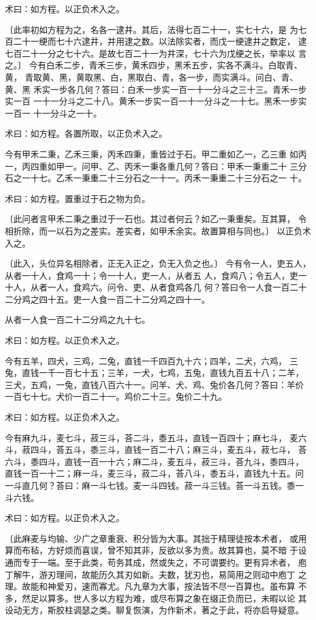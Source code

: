 \documentclass[12pt,UTF8]{ctexbook}
\begin{document}
术曰：如方程。以正负术入之。

〔此率初如方程为之，名各一逮井。其后，法得七百二十一，实七十六，是 为七百二十一绠而七十六逮井，并用逮之数。以法除实者，而戊一绠逮井之数定， 逮七百二十一分之七十六。是故七百二十一为井深，七十六为戊绠之长，举率以 言之。〕 今有白禾二步，青禾三步，黄禾四步，黑禾五步，实各不满斗。白取青、黄， 青取黄、黑，黄取黑、白，黑取白、青，各一步，而实满斗。问白、青、黄、黑 禾实一步各几何？答曰：白禾一步实一百一十一分斗之三十三。青禾一步实一百 一十一分斗之二十八。黄禾一步实一百一十一分斗之一十七。黑禾一步实一百一 十一分斗之一十。

术曰：如方程。各置所取，以正负术入之。

今有甲禾二秉，乙禾三秉，丙禾四秉，重皆过于石。甲二重如乙一，乙三重 如丙一，丙四重如甲一。问甲、乙、丙禾一秉各重几何？答曰：甲禾一秉重二十 三分石之一十七。乙禾一秉重二十三分石之一十一。丙禾一秉重二十三分石之一 十。

术曰：如方程。置重过于石之物为负。

〔此问者言甲禾二秉之重过于一石也。其过者何云？如乙一秉重矣。互其算， 令相折除，而一以石为之差实。差实者，如甲禾余实。故置算相与同也。〕 以正负术入之。

〔此入，头位异名相除者，正无入正之，负无入负之也。〕 今有令一人，吏五人，从者一十人，食鸡一十；令一十人，吏一人，从者五 人，食鸡八；令五人，吏一十人，从者一人，食鸡六。问令、吏、从者食鸡各几 何？答曰令一人食一百二十二分鸡之四十五。吏一人食一百二十二分鸡之四十一。

从者一人食一百二十二分鸡之九十七。

术曰：如方程。以正负术入之。

今有五羊，四犬，三鸡，二兔，直钱一千四百九十六；四羊，二犬，六鸡， 三兔，直钱一千一百七十五；三羊，一犬，七鸡，五兔，直钱九百五十八；二羊， 三犬，五鸡，一兔，直钱八百六十一。问羊、犬、鸡、兔价各几何？答曰：羊价 一百七十七。犬价一百二十一。鸡价二十三。兔价二十九。

术曰：如方程。以正负术入之。

今有麻九斗，麦七斗，菽三斗，荅二斗，黍五斗，直钱一百四十；麻七斗， 麦六斗，菽四斗，荅五斗，黍三斗，直钱一百二十八；麻三斗，麦五斗，菽七斗， 荅六斗，黍四斗，直钱一百一十六；麻二斗，麦五斗，菽三斗，荅九斗，黍四斗， 直钱一百一十二；麻一斗，麦三斗，菽二斗，荅八斗，黍五斗，直钱九十五。问 一斗直几何？荅曰：麻一斗七钱。麦一斗四钱。菽一斗三钱。荅一斗五钱。黍一 斗六钱。

术曰：如方程。以正负术入之。

〔此麻麦与均输、少广之章重衰、积分皆为大事。其拙于精理徒按本术者， 或用算而布毡，方好烦而喜误，曾不知其非，反欲以多为贵。故其算也，莫不暗 于设通而专于一端。至于此类，苟务其成，然或失之，不可谓要约。更有异术者， 庖丁解牛，游刃理间，故能历久其刃如新。夫数，犹刃也，易简用之则动中庖丁 之理。故能和神爱刃，速而寡尤。凡九章为大事，按法皆不尽一百算也。虽布算 不多，然足以算多。世人多以方程为难，或尽布算之象在缀正负而已，未暇以论 其设动无方，斯胶柱调瑟之类。聊复恢演，为作新术，著之于此，将亦启导疑意。
\end{document}
